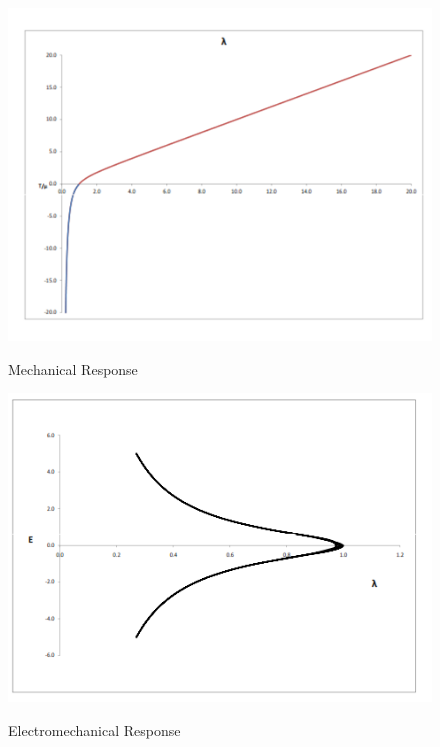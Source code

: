 \documentclass{beamer}
\begin{document}
\begin{frame}

\begin{figure}
\centering
\includegraphics[scale=0.3,trim = 0mm 0mm 0mm
00mm]{../images/eap_stress_stretch.png}
\label{fig:mechanical}
\caption{Mechanical Response}
\end{figure} 
\begin{figure}
\centering
\includegraphics[scale=0.3,trim = 0mm 0mm 0mm
00mm]{../images/eap_elect_stretch.png}
\label{fig:mechanical}

\caption{Electromechanical Response}

\end{figure} 

\end{frame}
\end{document}
